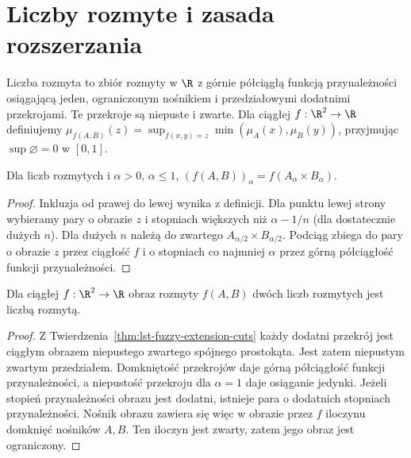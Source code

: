 \section{Liczby rozmyte i zasada rozszerzania}
Liczba rozmyta to zbiór rozmyty w $\R$ z górnie półciągłą funkcją
przynależności osiągającą jeden, ograniczonym nośnikiem i przedziałowymi
dodatnimi przekrojami. Te przekroje są niepuste i zwarte.
Dla ciągłej $f:\R^2\to\R$ definiujemy
$\mu_{f(A,B)}(z)=\sup_{f(x,y)=z}\min(\mu_A(x),\mu_B(y))$,
przyjmując $\sup\varnothing=0$ w $[0,1]$.
\begin{twierdzenie}\label{thm:lst-fuzzy-extension-cuts}
Dla liczb rozmytych i $\alpha>0$, $\alpha\leq1$,
$(f(A,B))_\alpha=f(A_\alpha\times B_\alpha)$.
\end{twierdzenie}
\begin{proof}
Inkluzja od prawej do lewej wynika z definicji. Dla punktu
lewej strony wybieramy pary o obrazie $z$ i stopniach większych niż
$\alpha-1/n$ (dla dostatecznie dużych $n$). Dla dużych $n$ należą do zwartego
$A_{\alpha/2}\times B_{\alpha/2}$. Podciąg zbiega do pary
o obrazie $z$ przez ciągłość $f$ i o stopniach co najmniej $\alpha$
przez górną półciągłość funkcji przynależności.
\end{proof}
\begin{wniosek}\label{cor:lst-fuzzy-extension-number}
Dla ciągłej $f:\R^2\to\R$ obraz rozmyty $f(A,B)$
dwóch liczb rozmytych jest liczbą rozmytą.
\end{wniosek}
\begin{proof}
Z Twierdzenia~\ref{thm:lst-fuzzy-extension-cuts} każdy
dodatni przekrój jest ciągłym obrazem niepustego
zwartego spójnego prostokąta. Jest zatem niepustym
zwartym przedziałem. Domkniętość przekrojów daje
górną półciągłość funkcji przynależności, a niepustość
przekroju dla $\alpha=1$ daje osiąganie jedynki.
Jeżeli stopień przynależności obrazu jest dodatni,
istnieje para o dodatnich stopniach przynależności.
Nośnik obrazu zawiera się więc w obrazie przez $f$
iloczynu domknięć nośników $A,B$. Ten iloczyn jest
zwarty, zatem jego obraz jest ograniczony.
\end{proof}


